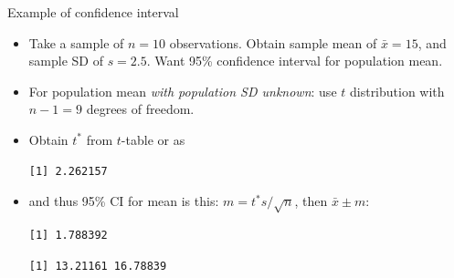 \begin{frame}[fragile]{Example of confidence interval}
  
  \begin{itemize}
  \item Take a sample of $n=10$ observations. Obtain sample mean of
    $\bar{x}=15$, and sample SD of $s=2.5$. Want 95\% confidence
    interval for population mean.
  \item For population mean \emph{with population SD unknown}: use $t$
    distribution with $n-1=9$ degrees of freedom.
  \item Obtain $t^*$ from $t$-table or as
\begin{knitrout}
\color{fgcolor}\begin{kframe}
\begin{alltt}
\hlkwb{=}\hlstd{(}\hlopt{-}\hlopt{/}\hlstd{,}
\end{alltt}
\begin{verbatim}
[1] 2.262157
\end{verbatim}
\end{kframe}
\end{knitrout}
\item and thus 95\% CI for mean is this: $m=t^* s / \sqrt{n}$, then
  $\bar{x} \pm m$:
\begin{knitrout}
\color{fgcolor}\begin{kframe}
\begin{alltt}
\hlkwb{=}\hlopt{*}\hlopt{/}\hlstd{(}
\end{alltt}
\begin{verbatim}
[1] 1.788392
\end{verbatim}
\begin{alltt}
\hlstd{(}\hlopt{-}\hlopt{+}
\end{alltt}
\begin{verbatim}
[1] 13.21161 16.78839
\end{verbatim}
\end{kframe}
\end{knitrout}
  \end{itemize}
  
\end{frame}


